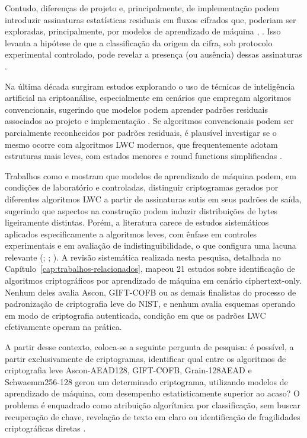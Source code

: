 Contudo, diferenças de projeto e, principalmente, de implementação podem introduzir assinaturas estatísticas residuais em fluxos cifrados que, poderiam ser exploradas, principalmente, por modelos de aprendizado de máquina \cite{Rukhin2010NIST80022}, \cite{Ahmadzadeh2022EncryptedTraffic}. Isso levanta a hipótese de que a classificação da origem da cifra, sob protocolo experimental controlado, pode revelar a presença (ou ausência) dessas assinaturas \cite{Turan2023NISTLWCFinal}.

Na última década surgiram estudos explorando o uso de técnicas de inteligência artificial na criptoanálise, especialmente em cenários que empregam algoritmos convencionais, sugerindo que modelos podem aprender padrões residuais associados ao projeto e implementação \cite{Ahmadzadeh2022EncryptedTraffic}. Se algoritmos convencionais podem ser parcialmente reconhecidos por padrões residuais, é plausível investigar se o mesmo ocorre com algoritmos LWC modernos, que frequentemente adotam estruturas mais leves, com estados menores e round functions simplificadas \cite{Shen2024LWCSurvey}.

Trabalhos como \cite{Yuan2023HRFLR} e \cite{Kopal2020CiphersNeurons} mostram que modelos de aprendizado de máquina podem, em condições de laboratório e controladas, distinguir criptogramas gerados por diferentes algoritmos LWC a partir de assinaturas sutis em seus padrões de saída, sugerindo que aspectos na construção podem induzir distribuições de bytes ligeiramente distintas.
Porém, a literatura carece de estudos sistemáticos aplicados especificamente a algoritmos leves, com ênfase em controles experimentais e em avaliação de indistinguibilidade, o que configura uma lacuna relevante (\cite{Yuan2023HRFLR}; \cite{Kopal2020CiphersNeurons}; \cite{Leierzopf2021MassiveMLCipherType}).
A revisão sistemática realizada nesta pesquisa, detalhada no Capítulo~\ref{cap:trabalhos-relacionados}, mapeou 21 estudos sobre identificação de algoritmos criptográficos por aprendizado de máquina em cenário ciphertext-only. Nenhum deles avalia Ascon, GIFT-COFB ou as demais finalistas do processo de padronização de criptografia leve do NIST, e nenhum avalia esquemas operando em modo de criptografia autenticada, condição em que os padrões LWC efetivamente operam na prática.

A partir desse contexto, coloca-se a seguinte pergunta de pesquisa: é possível, a partir exclusivamente de criptogramas, identificar qual entre os algoritmos de criptografia leve Ascon-AEAD128, GIFT-COFB, Grain-128AEAD e Schwaemm256-128 gerou um determinado criptograma, utilizando modelos de aprendizado de máquina, com desempenho estatisticamente superior ao acaso?
O problema é enquadrado como atribuição algorítmica por classificação, sem buscar recuperação de chave, revelação de texto em claro ou identificação de fragilidades criptográficas diretas \cite{Turan2023NISTLWCFinal}.

